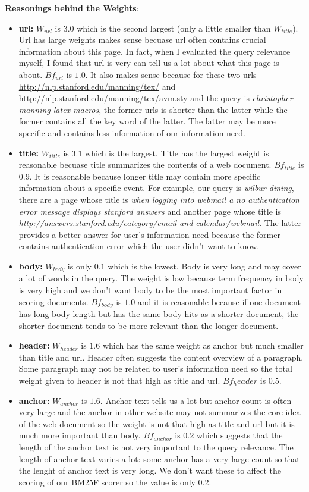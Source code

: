 \documentclass{article}
\begin{document}
\textbf{Reasonings behind the Weights}:

\begin{itemize}
  \item \textbf{url:} $W_{url}$ is $3.0$ which is the second largest (only a little smaller than $W_{title}$). Url has large weights makes sense becuase url often contains crucial information about this page. In fact, when I evaluated the query relevance myself, I found that url is very can tell us a lot about what this page is about. $Bf_{url}$ is $1.0$. It also makes sense because for these two urls \url{http://nlp.stanford.edu/manning/tex/} and \url{http://nlp.stanford.edu/manning/tex/avm.sty} and the query is \textit{christopher manning latex macros}, the former urls is shorter than the latter while the former contains all the key word of the latter. The latter may be more specific and contains less information of our information need.
  \item \textbf{title:} $W_{title}$ is $3.1$ which is the largest. Title has the largest weight is reasonable becuase title summarizes the contents of a web document. $Bf_{title}$ is $0.9$. It is reasonable because longer title may contain more specific information about a specific event. For example, our query is \textit{ wilbur dining}, there are a page whose title is \textit{when logging into webmail a no authentication error message displays stanford answers} and another page whose title is \textit{http://answers.stanford.edu/category/email-and-calendar/webmail}. The latter provides a better answer for user's information need because the former contains authentication error which the user didn't want to know.
  \item \textbf{body:} $W_{body}$ is only $0.1$ which is the lowest. Body is very long and may cover a lot of words in the query. The weight is low because term frequency in body is very high and we don't want body to be the most important factor in scoring documents. $Bf_{body}$ is $1.0$ and it is reasonable because if one document has long body length but has the same body hits as a shorter document, the shorter document tends to be more relevant than the longer document.
  \item \textbf{header:} $W_{header}$ is $1.6$ which has the same weight as anchor but much smaller than title and url. Header often suggests the content overview of a paragraph. Some paragraph may not be related to user's information need so the total weight given to header is not that high as title and url. $Bf_header$ is $0.5$.
  \item \textbf{anchor:} $W_{anchor}$ is $1.6$. Anchor text tells us a lot but anchor count is often very large and the anchor in other website may not summarizes the core idea of the web document so the weight is not that high as title and url but it is much more important than body. $Bf_{anchor}$ is 0.2 which suggests that the length of the anchor text is not very important to the query relevance. The length of anchor text varies a lot: some anchor has a very large count so that the lenght of anchor text is very long. We don't want these to affect the scoring of our BM25F scorer so the value is only 0.2.
\end{itemize}
\end{document}
